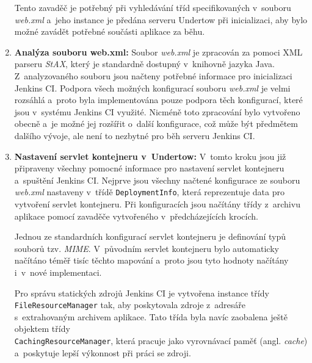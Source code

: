 \begin{enumerate}
                    Tento zavaděč je potřebný
                    při vyhledávání tříd specifikovaných v~souboru \emph{web.xml} a~jeho instance
                    je předána serveru Undertow při inicializaci, aby bylo možné zavádět
                    potřebné součásti aplikace za běhu.

                \item \textbf{Analýza souboru web.xml:} Soubor \emph{web.xml} je 
                    zpracován za pomoci XML parseru \emph{StAX}, který je standardně dostupný v~knihovně
                    jazyka Java. Z~analyzovaného souboru jsou načteny potřebné informace pro inicializaci
                    Jenkins CI. Podpora všech možných konfigurací souboru \emph{web.xml} je velmi rozsáhlá
                    a~proto byla implementována pouze podpora těch konfigurací, které jsou
                    v~systému Jenkins CI využité. Nicméně toto zpracování bylo vytvořeno obecně 
                    a~je možné jej rozšířit o~další konfigurace, což může být předmětem dalšího vývoje,
                    ale není to nezbytné pro běh serveru Jenkins CI.
                
                \item \textbf{Nastavení servlet kontejneru v~Undertow:} V~tomto kroku
                    jsou již připraveny všechny pomocné informace pro nastavení servlet kontejneru
                    a~spuštění Jenkins CI. Nejprve jsou všechny načtené konfigurace ze souboru \emph{web.xml}
                    nastaveny v~třídě \texttt{DeploymentInfo}, která reprezentuje data pro vytvoření servlet
                    kontejneru. Při konfiguracích jsou načítány třídy z~archivu aplikace pomocí zavaděče vytvořeného
                    v~předcházejících krocích.

                    Jednou ze standardních konfigurací servlet kontejneru je definování typů souborů tzv.
                    \emph{MIME}. V~původním servlet kontejneru bylo automaticky načítáno téměř tisíc těchto mapování
                    a~proto jsou tyto hodnoty načítány i~v~nové implementaci.
                    
                    Pro správu statických zdrojů Jenkins CI je vytvořena instance třídy \\\texttt{FileResourceManager}
                    tak, aby poskytovala zdroje z~adresáře s~extrahovaným archivem aplikace. Tato třída
                    byla navíc zaobalena ještě objektem třídy \\\texttt{CachingResourceManager}, která
                    pracuje jako vyrovnávací paměť (angl. \emph{cache}) a~poskytuje lepší výkonnost
                    při práci se zdroji.



\end{enumerate}
